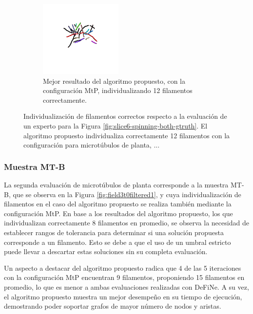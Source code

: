 \begin{figure}[h!]
    \hspace{0.2cm}
    \begin{subfigure}[t]{0.48\textwidth}
        \centering
        \includegraphics[height=1.5in]{resultImages/slice6-spinning-merged-gtruths-segmented-phil-s29-v05-exactMatch-no-label-ants.png}
        \caption{Mejor resultado del algoritmo propuesto, con la configuraci\'on MtP, individualizando 12 filamentos correctamente.}
        \label{fig:MTA2-best-phil}
    \end{subfigure}
        
    \caption[Individualizaci\'on de filamentos correctos respecto a la evaluaci\'on de un experto para la Figura \ref{fig:slice6-spinning-both-gtruth}.]{Individualizaci\'on de filamentos correctos respecto a la evaluaci\'on de un experto para la Figura \ref{fig:slice6-spinning-both-gtruth}. El algoritmo propuesto individualiza correctamente 12 filamentos con la configuraci\'on para microt\'ubulos de planta, ...}
    \label{fig:slice6-spinning-both-gtruth-MTA3-results}
\end{figure}


\subsubsection{Muestra MT-B}
La segunda evaluaci\'on de microt\'ubulos de planta corresponde a la muestra MT-B, que se observa en la Figura \ref{fig:field3t0filtered1}, y cuya individualizaci\'on de filamentos en el caso del algoritmo propuesto se realiza tambi\'en mediante la configuraci\'on MtP. En base a los resultados del algoritmo propuesto, los que individualizan correctamente 8 filamentos en promedio, se observa la necesidad de establecer rangos de tolerancia para determinar si una soluci\'on propuesta corresponde a un filamento. Esto se debe a que el uso de un umbral estricto puede llevar a descartar estas soluciones sin su completa evaluaci\'on.

Un aspecto a destacar del algoritmo propuesto radica que 4 de las 5 iteraciones con la configuraci\'on MtP encuentran 9 filamentos, proponiendo 15 filamentos en promedio, lo que es menor a ambas evaluaciones realizadas con DeFiNe. A su vez, el algoritmo propuesto muestra un mejor desempe\~no en su tiempo de ejecuci\'on, demostrando poder soportar grafos de mayor n\'umero de nodos y aristas.

